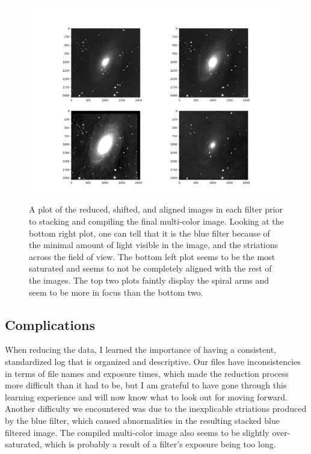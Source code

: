 \documentclass[]{aastex63}
\begin{document}
\begin{figure}[h]
    \centering
    \includegraphics[scale=.4]{shifted_images.png}
    \caption{A plot of the reduced, shifted, and aligned images in each filter prior to stacking and compiling the final multi-color image. Looking at the bottom right plot, one can tell that it is the blue filter because of the minimal amount of light visible in the image, and the striations across the field of view. The bottom left plot seems to be the most saturated and seems to not be completely aligned with the rest of the images. The top two plots faintly display the spiral arms and seem to be more in focus than the bottom two.}
    \label{fig:shifted}
\end{figure}

\subsection{Complications}
When reducing the data, I learned the importance of having a consistent, standardized log that is organized and descriptive. Our files have inconsistencies in terms of file names and exposure times, which made the reduction process more difficult than it had to be, but I am grateful to have gone through this learning experience and will now know what to look out for moving forward. Another difficulty we encountered was due to the inexplicable striations produced by the blue filter, which caused abnormalities in the resulting stacked blue filtered image. The compiled multi-color image also seems to be slightly over-saturated, which is probably a result of a filter's exposure being too long.
\end{document}
